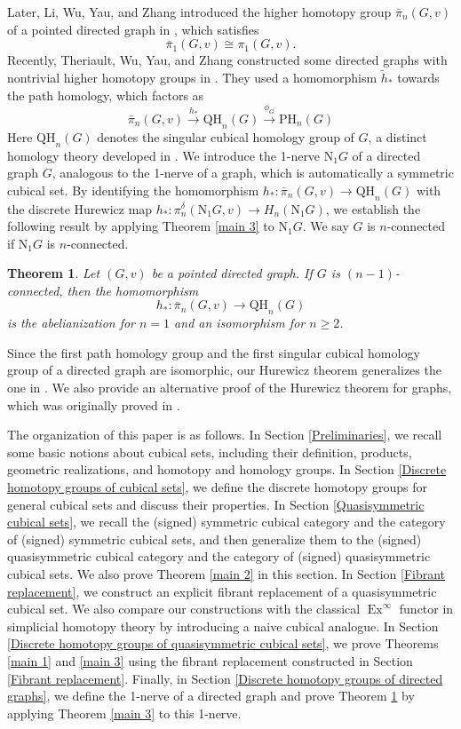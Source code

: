 \documentclass[oneside, 12pt]{amsart}
\numberwithin{equation}{section}
\theoremstyle{plain}
\newtheorem{theorem}{Theorem}[section]
\theoremstyle{definition}
\theoremstyle{remark}
\newcommand{\ex}{\operatorname{Ex}}
\begin{document}
	
	Later, Li, Wu, Yau, and Zhang introduced the higher homotopy group $\bar{\pi}_n(G,v)$ of a pointed directed graph in \cite{LWYZ}, which satisfies
	\[
	\bar{\pi}_1(G,v)\cong\pi_1(G,v).
	\] 
	Recently, Theriault, Wu, Yau, and Zhang constructed some directed graphs with nontrivial higher homotopy groups in \cite{TWYZ}. They used a homomorphism $\tilde{h}_*$ towards the path homology, which factors as
	\begin{equation}
		\label{TWYZ Hurewicz map}
		\bar{\pi}_n(G,v)\xrightarrow{h_*}\mathrm{QH}_n(G)\xrightarrow{\phi_G}\mathrm{PH}_n(G)
	\end{equation}
	Here $\mathrm{QH}_n(G)$ denotes the singular cubical homology group of $G$, a distinct homology theory developed in \cite{GM2}. We introduce the 1-nerve $\mathrm{N}_1G$ of a directed graph $G$, analogous to the 1-nerve of a graph, which is automatically a symmetric cubical set. By identifying the homomorphism $h_*\colon\bar{\pi}_n(G,v)\to \mathrm{QH}_n(G)$ with the discrete Hurewicz map $h_*\colon\pi_n^\delta(\mathrm{N}_1G,v)\to H_n(\mathrm{N}_1G)$, we establish the following result by applying Theorem \ref{main 3} to $\mathrm{N}_1G$. We say $G$ is $n$-connected if $\mathrm{N}_1G$ is $n$-connected. 
	\begin{theorem}
		\label{main 4}
		Let $(G,v)$ be a pointed directed graph. If $G$ is $(n-1)$-connected, then the homomorphism
		\[
		h_*\colon\bar{\pi}_n(G,v)\to \mathrm{QH}_n(G)
		\]
		is the abelianization for $n=1$ and an isomorphism for $n\ge2$.
	\end{theorem}
	Since the first path homology group and the first singular cubical homology group of a directed graph are isomorphic, our Hurewicz theorem generalizes the one in \cite{GLMY2}. We also provide an alternative proof of the Hurewicz theorem for graphs, which was originally proved in \cite{CK2}.

	
	The organization of this paper is as follows. In Section \ref{Preliminaries}, we recall some basic notions about cubical sets, including their definition, products, geometric realizations, and homotopy and homology groups. In Section \ref{Discrete homotopy groups of cubical sets}, we define the discrete homotopy groups for general cubical sets and discuss their properties. In Section \ref{Quasisymmetric cubical sets}, we recall the (signed) symmetric cubical category and the category of (signed) symmetric cubical sets, and then generalize them to the (signed) quasisymmetric cubical category and the category of (signed) quasisymmetric cubical sets. We also prove Theorem \ref{main 2} in this section. In Section \ref{Fibrant replacement}, we construct an explicit fibrant replacement of a quasisymmetric cubical set. We also compare our constructions with the classical \(\ex^\infty\) functor in simplicial homotopy theory by introducing a naive cubical analogue. In Section \ref{Discrete homotopy groups of quasisymmetric cubical sets}, we prove Theorems \ref{main 1} and \ref{main 3} using the fibrant replacement constructed in Section \ref{Fibrant replacement}. Finally, in Section \ref{Discrete homotopy groups of directed graphs}, we define the 1-nerve of a directed graph and prove Theorem \ref{main 4} by applying Theorem \ref{main 3} to this 1-nerve.
	
\end{document}
